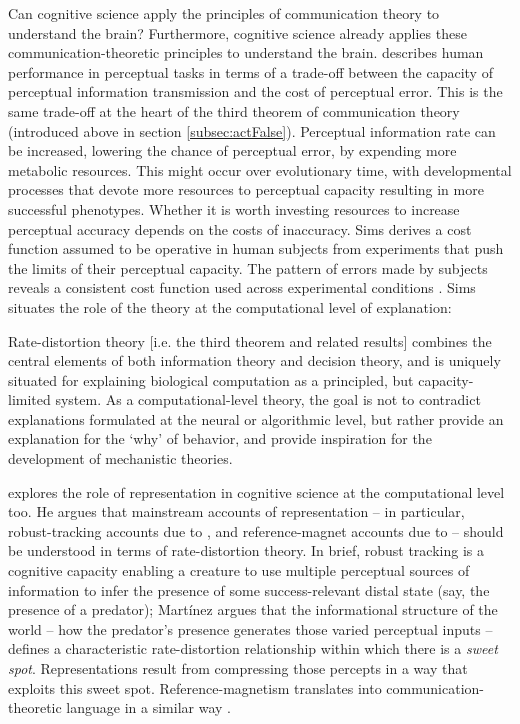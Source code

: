\documentclass[12pt]{article}
\begin{document}
Can cognitive science apply the principles of communication theory to understand the brain?
Furthermore, cognitive science already applies these communication-theoretic principles to understand the brain.
\citet{sims2016ratedistortion} describes human performance in perceptual tasks in terms of a trade-off between the capacity of perceptual information transmission and the cost of perceptual error.
This is the same trade-off at the heart of the third theorem of communication theory (introduced above in section \ref{subsec:actFalse}).
Perceptual information rate can be increased, lowering the chance of perceptual error, by expending more metabolic resources.
This might occur over evolutionary time, with developmental processes that devote more resources to perceptual capacity resulting in more successful phenotypes.
Whether it is worth investing resources to increase perceptual accuracy depends on the costs of inaccuracy.
Sims derives a cost function assumed to be operative in human subjects from experiments that push the limits of their perceptual capacity.
The pattern of errors made by subjects reveals a consistent cost function used across experimental conditions \citep[188]{sims2016ratedistortion}.
Sims situates the role of the theory at the computational level of explanation:

\begin{myquote}
Rate-distortion theory [i.e. the third theorem and related results] combines the central elements of both information theory and decision theory, and is uniquely situated for explaining biological computation as a principled, but capacity-limited system. As a computational-level theory, the goal is not to contradict explanations formulated at the neural or algorithmic level, but rather provide an explanation for the `why' of behavior, and provide inspiration for the development of mechanistic theories.
\par\hspace*{\fill}\citet[193]{sims2016ratedistortion}
\end{myquote}

\citet{martinez2019representations} explores the role of representation in cognitive science at the computational level too.
He argues that mainstream accounts of representation -- in particular, robust-tracking accounts due to \citet{sterelny2003thought,burge2010origins}, and reference-magnet accounts due to \citet{ryder2004sinbad,lewis1984putnam} -- should be understood in terms of rate-distortion theory.
In brief, robust tracking is a cognitive capacity enabling a creature to use multiple perceptual sources of information to infer the presence of some success-relevant distal state (say, the presence of a predator); Mart\'{i}nez argues that the informational structure of the world -- how the predator's presence generates those varied perceptual inputs -- defines a characteristic rate-distortion relationship within which there is a \textit{sweet spot}.
Representations result from compressing those percepts in a way that exploits this sweet spot.
Reference-magnetism translates into communication-theoretic language in a similar way \citep[1223]{martinez2019representations}.
\end{document}
